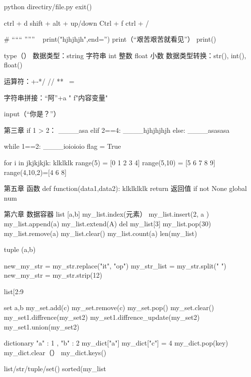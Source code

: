 python directiry/file.py %
exit()  %

ctrl + d %
shift + alt + up/down %
Ctrl + f %
ctrl + / %

#  %
“““     ”””   %
\ %
print("hjhjhjh",end='')  %
print（“艰苦艰苦就看见”）  %
print()  %

type（）  %
数据类型：string 字符串
          int    整数
          float  小数
数据类型转换：str(), int(), float()

运算符：+-*/  // %
              ** %
              ~= %

字符串拼接：“阿”+a 
            "  %
            f"内容{变量}"   %

input（“你是？”）  %


第三章
if 1 > 2：
____asa
elif 2==4:
____hjhjhjhjh
else:
____asasasa

while 1==2:
____ioioioio
flag = True

for i in jkjkjkjk:
    klklklk
range(5) = [0 1 2 3 4]
range(5,10) = [5 6 7 8 9]
range(4,10,2)=[4 6 8]

第五章 函数
def function(data1,data2):
    klklklklk
    return 返回值
if not None %
global num  %

第六章  数据容器
list  [a,b]
my_list.index(元素） %
my_list.insert(2, a )  %
my_list.append(a)  %
my_list.extend(A)  %
del my_list[3]    %
my_list.pop(30)   %
my_list.remove(a)   %
my_list.clear()   %
my_list.count(a)   %
len(my_list)    %

tuple (a,b)  %

new_my_str = my_str.replace("it", "op")  %
my_str_list = my_str.split(" ")  %
new_my_str = my_str.strip(12)  %

list[2:9%

set {a,b}  %
my_set.add(c)  %
my_set.remove(c)  %
my_set.pop()  %
my_set.clear()  %
my_set1.diffrence(my_set2) %
my_set1.diffrence_update(my_set2) %
my_set1.union(my_set2) %

dictionary  {"a" : 1 , "b" : 2}  %
my_dict["a"] %
my_dict["c"] = 4  %
my_dict.pop(key)  %
my_dict.clear（）
my_dict.keys()  %

list/str/tuple/set()  %
sorted(my_list%






